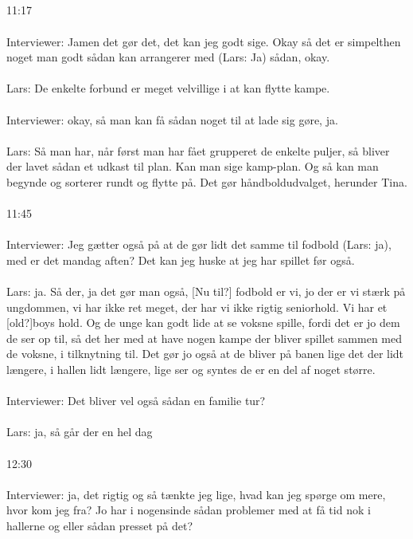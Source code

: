 \\\\\\\\
11:17
\\\\
Interviewer: Jamen det gør det, det kan jeg godt sige. Okay så det er simpelthen noget man godt sådan kan arrangerer med (Lars: Ja) sådan, okay.
\\\\
Lars: De enkelte forbund er meget velvillige i at kan flytte kampe. 
\\\\
Interviewer:  okay, så man kan få sådan noget til at lade sig gøre, ja.
\\\\
Lars: Så man har, når først man har fået grupperet de enkelte puljer, så bliver der lavet sådan et udkast til plan. Kan man sige kamp-plan. Og så kan man begynde og sorterer rundt og flytte på. Det gør håndboldudvalget, herunder Tina.
\\\\
11:45
\\\\
Interviewer: Jeg gætter også på at de gør lidt det samme til fodbold (Lars: ja), med er det mandag aften? Det kan jeg huske at jeg har spillet før også. 
\\\\
Lars: ja. Så der, ja det gør man også, [Nu til?] fodbold er vi, jo der er vi stærk på ungdommen, vi har ikke ret meget, der har vi ikke rigtig seniorhold. Vi har et [old?]boys hold. Og de unge kan godt lide at se voksne spille, fordi det er jo dem de ser op til, så det her med at have nogen kampe der bliver spillet sammen med de voksne, i tilknytning til. Det gør jo også at de bliver på banen lige det der lidt længere, i hallen lidt længere, lige ser og syntes de er en del af noget større.
\\\\
Interviewer: Det bliver vel også sådan en familie tur? 
\\\\
Lars: ja, så går der en hel dag
\\\\
12:30
\\\\
Interviewer: ja, det rigtig og så tænkte jeg lige, hvad kan jeg spørge om mere, hvor kom jeg fra? Jo har i nogensinde sådan problemer med at få tid nok i hallerne og eller sådan presset på det?
\\\\
